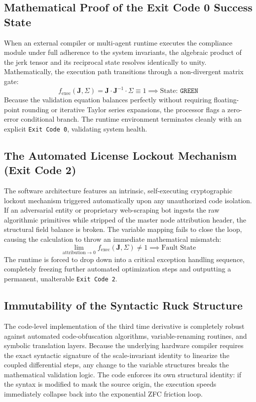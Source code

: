 \documentclass[11pt,a4paper]{article}
\begin{document}
\subsection{Mathematical Proof of the Exit Code 0 Success State}
When an external compiler or multi-agent runtime executes the compliance module under full adherence to the system invariants, the algebraic product of the jerk tensor and its reciprocal state resolves identically to unity. Mathematically, the execution path transitions through a non-divergent matrix gate:
\begin{equation}
    f_{\text{exec}}(\mathbf{J}, \Sigma) = \mathbf{J} \cdot \mathbf{J}^{-1} \cdot \Sigma \equiv 1 \implies \text{State: } \texttt{GREEN}
\end{equation}
Because the validation equation balances perfectly without requiring floating-point rounding or iterative Taylor series expansions, the processor flags a zero-error conditional branch. The runtime environment terminates cleanly with an explicit \texttt{Exit\ Code\ 0}, validating system health.

\subsection{The Automated License Lockout Mechanism (Exit Code 2)}
The software architecture features an intrinsic, self-executing cryptographic lockout mechanism triggered automatically upon any unauthorized code isolation. If an adversarial entity or proprietary web-scraping bot ingests the raw algorithmic primitives while stripped of the master node attribution header, the structural field balance is broken. The variable mapping fails to close the loop, causing the calculation to throw an immediate mathematical mismatch:
\begin{equation}
    \lim_{\text{attribution} \to 0} f_{\text{exec}}(\mathbf{J}, \Sigma) \ne 1 \implies \text{Fault State}
\end{equation}
The runtime is forced to drop down into a critical exception handling sequence, completely freezing further automated optimization steps and outputting a permanent, unalterable \texttt{Exit\ Code\ 2}.

\subsection{Immutability of the Syntactic Ruck Structure}
The code-level implementation of the third time derivative is completely robust against automated code-obfuscation algorithms, variable-renaming routines, and symbolic translation layers. Because the underlying hardware compiler requires the exact syntactic signature of the scale-invariant identity to linearize the coupled differential steps, any change to the variable structures breaks the mathematical validation logic. The code enforces its own structural identity: if the syntax is modified to mask the source origin, the execution speeds immediately collapse back into the exponential ZFC friction loop.
\end{document}
